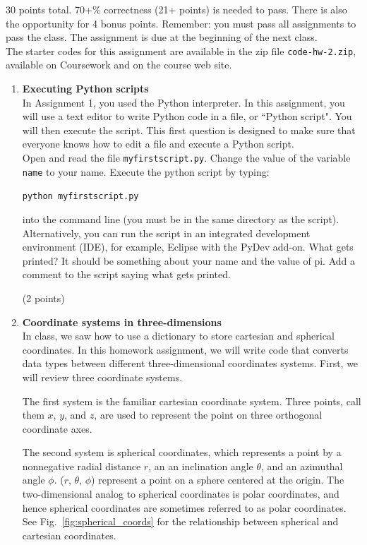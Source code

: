 \documentclass{article}
\newcounter{points}
\newcommand\setpoints[1]{\addtocounter{points}{#1}(#1 points)}
\begin{document}
\pagestyle{fancy}

30 points total.  70+\% correctness (21+ points) is needed to pass.  There is also the opportunity for 4 bonus points.  Remember: you must pass all assignments to pass the class.  The assignment is due at the beginning of the next class. \\

The starter codes for this assignment are available in the zip file \texttt{code-hw-2.zip}, available on Coursework and on the course web site.

\begin{enumerate}
\item \textbf{Executing Python scripts} \\
In Assignment 1, you used the Python interpreter.  In this assignment, you will use a text editor to write Python code in a file, or ``Python script".  You will then execute the script.  This first question is designed to make sure that everyone knows how to edit a file and execute a Python script. \\

Open and read the file \texttt{myfirstscript.py}.  Change the value of the variable \texttt{name} to your name.  Execute the python script by typing:
\begin{center}
\texttt{python myfirstscript.py}
\end{center}
into the command line (you must be in the same directory as the script).  Alternatively, you can run the script in an integrated development environment (IDE), for example, Eclipse with the PyDev add-on.  What gets printed?  It should be something about your name and the value of pi.  Add a comment to the script saying what gets printed.  \setpoints{2}

\newpage

\item \textbf{Coordinate systems in three-dimensions} \\
In class, we saw how to use a dictionary to store cartesian and spherical coordinates.  In this homework assignment, we will write code that converts data types between different three-dimensional coordinates systems.  First, we will review three coordinate systems.

The first system is the familiar cartesian coordinate system.  Three points, call them $x$, $y$, and $z$, are used to represent the point on three orthogonal coordinate axes.

The second system is spherical coordinates, which represents a point by a nonnegative radial distance $r$, an an inclination angle $\theta$, and an azimuthal angle $\phi$.  ($r$, $\theta$, $\phi$) represent a point on a sphere centered at the origin.  The two-dimensional analog to spherical coordinates is polar coordinates, and hence spherical coordinates are sometimes referred to as polar coordinates.  See Fig.~\ref{fig:spherical_coords} for the relationship between spherical and cartesian coordinates.


\end{enumerate}
\end{document}
